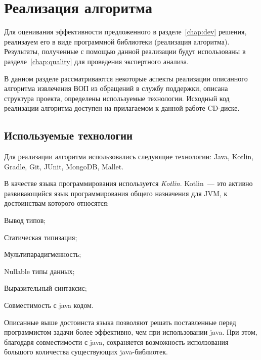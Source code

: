 \chapter{Реализация алгоритма}
\label{chap:impl}

Для оценивания эффективности предложенного в разделе~\ref{chap:dev} решения, реализауем его в виде программной библиотеки (реализация алгоритма). Результаты, полученные с помощью данной реализации будут использованы в разделе~\ref{chap:quality} для проведения экспертного анализа.

В данном разделе рассматриваются некоторые аспекты реализации описанного алгоритма извлечения ВОП из обращений в службу поддержки, описана структура проекта, определены используемые технологии. Исходный код реализации алгоритма доступен на прилагаемом к данной работе CD-диске.

\section{Используемые технологии}
Для реализации алгоритма использовались следующие технологии: Java, Kotlin, Gradle, Git, JUnit, MongoDB, Mallet.

В качестве языка программирования используется \textit{Kotlin}. Kotlin~--- это активно развивающийся язык программирования общего назначения для JVM, к достоинствам которого относятся:


\begin{itemize*}
\item Вывод типов;
\item Статическая типизация;
\item Мультипарадигменность;
\item Nullable типы данных;
\item Выразительный синтаксис;
\item Совместимость с java кодом.
\end{itemize*}

Описанные выше достоинста языка позволяют решать поставленные перед программистом задачи более эффективно, чем при использовании java. При этом, благодаря совместимости с java, сохраняется возможность исползования большого количества существующих java-библиотек.

